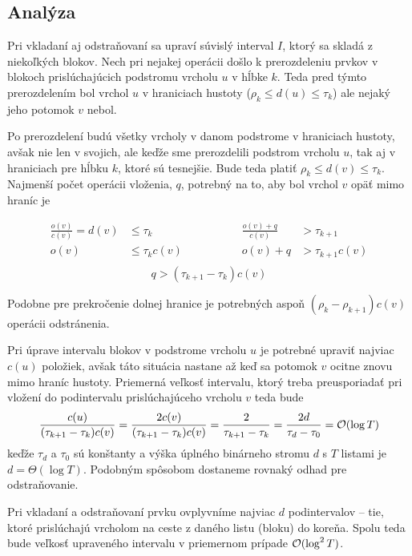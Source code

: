 \subsection{Analýza}

Pri vkladaní aj odstraňovaní sa upraví súvislý interval $I$, ktorý sa skladá z niekoľkých blokov. Nech pri nejakej operácii došlo k prerozdeleniu prvkov v blokoch prislúchajúcich podstromu vrcholu $u$ v hĺbke $k$. Teda pred týmto prerozdelením bol vrchol $u$ v hraniciach hustoty ($\rho_k \le d(u) \le \tau_k$) ale nejaký jeho potomok $v$ nebol.

Po prerozdelení budú všetky vrcholy v danom podstrome v hraniciach hustoty, avšak nie len v svojich, ale keďže sme prerozdelili podstrom vrcholu $u$, tak aj v hraniciach pre hĺbku $k$, ktoré sú tesnejšie. Bude teda platiť $\rho_k \le d(v) \le \tau_k$. Najmenší počet operácii vloženia, $q$, potrebný na to, aby bol vrchol $v$ opäť mimo hraníc je

\[
\begin{aligned}
\frac{o(v)}{c(v)} = d(v) &\le \tau_k \hspace{3cm} & \frac{o(v)+q}{c(v)} &> \tau_{k+1} \\
o(v) &\le \tau_k c(v) & o(v)+q &> \tau_{k+1}c(v) \\
\end{aligned}
\]\[
q > (\tau_{k+1}-\tau_k)c(v)
\]

Podobne pre prekročenie dolnej hranice je potrebných aspoň $(\rho_k-\rho_{k+1})c(v)$ operácii odstránenia.

Pri úprave intervalu blokov v podstrome vrcholu $u$ je potrebné upraviť najviac $c(u)$ položiek, avšak táto situácia nastane až keď sa potomok $v$ ocitne znovu mimo hraníc hustoty. Priemerná veľkosť intervalu, ktorý treba preusporiadať pri vložení do podintervalu prislúchajúceho vrcholu $v$ teda bude
\[
\frac{c(u)}{(\tau_{k+1}-\tau_k)c(v)} = \frac{2c(v)}{(\tau_{k+1}-\tau_k)c(v)} = \frac{2}{\tau_{k+1}-\tau_k} = \frac{2d}{\tau_d-\tau_0} = \mathcal{O}(\log{T})
\]
keďže $\tau_d$ a $\tau_0$ sú konštanty a výška úplného binárneho stromu $d$ s $T$ listami je $d = \Theta(\log{T})$. Podobným spôsobom dostaneme rovnaký odhad pre odstraňovanie.

Pri vkladaní a odstraňovaní prvku ovplyvníme najviac $d$ podintervalov -- tie, ktoré prislúchajú vrcholom na ceste z daného listu (bloku) do koreňa. Spolu teda bude veľkosť upraveného intervalu v priemernom prípade $\mathcal{O}(\log^2{T})$.


